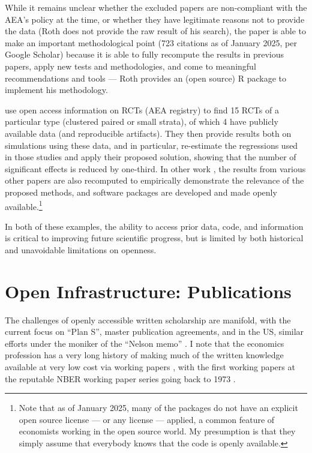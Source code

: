 \documentclass{article}
\begin{document}
{While it remains unclear whether the excluded papers are non-compliant with the AEA's policy at the time, or whether they have legitimate reasons not to provide the data (Roth does not provide the raw result of his search), the paper is able to make an important methodological point (723 citations as of January 2025, per Google Scholar) because it is able to fully recompute the results in previous papers, apply new tests and methodologies, and come to meaningful recommendations and tools --- Roth provides an (open source) R package to implement his methodology.

\citet{de_chaisemartin_at_2024} use open access information on RCTs (AEA registry) to find 15 RCTs of a particular type (clustered paired or small strata), of which 4 have publicly available data (and reproducible artifacts). They then provide results both on simulations using these data, and in particular, re-estimate the regressions used in those studies and apply their proposed solution, showing that the number of significant effects is reduced by one-third. In other work \citep{de_chaisemartin_two-way_2020,de_chaisemartin_difference--differences_2024}, the results from various other papers are also recomputed to empirically demonstrate the relevance of the proposed methods, and software packages \citep[e.g.][]{de_chaisemartin_chaisemartinpackagesdid_multiplegt_dyn_2025} are developed and made openly available.\footnote{Note that as of January 2025, many of the packages do not have an explicit open source license --- or any license --- applied, a common feature of economists working in the open source world. My presumption is that they simply assume that everybody knows that the code is openly available.}

In both of these examples, the ability to access prior data, code, and information is critical to improving future scientific progress, but is limited by both historical and unavoidable limitations on openness.


\section{Open Infrastructure: Publications}
\label{sec:publications}

The challenges of openly accessible written scholarship are manifold, with the current focus on ``Plan S'', master publication agreements, and in the US, similar efforts under the moniker of the ``Nelson memo'' \parencite{brainard_white_2022,brainard_us_2024}. I note that the economics profession has a very long history of making much of the written knowledge available at very low cost via working papers \parencite{vilhuber_reproducibility_2020}, with the first working papers at the reputable NBER working paper series going back to 1973 \parencite{welch_education_1973}.

}
\end{document}
